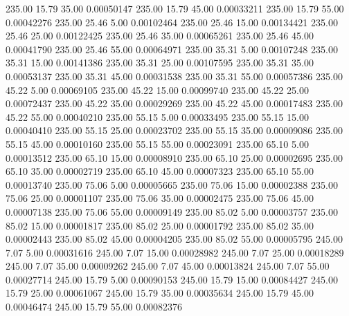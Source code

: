     235.00     15.79     35.00     0.00050147
    235.00     15.79     45.00     0.00033211
    235.00     15.79     55.00     0.00042276
    235.00     25.46      5.00     0.00102464
    235.00     25.46     15.00     0.00134421
    235.00     25.46     25.00     0.00122425
    235.00     25.46     35.00     0.00065261
    235.00     25.46     45.00     0.00041790
    235.00     25.46     55.00     0.00064971
    235.00     35.31      5.00     0.00107248
    235.00     35.31     15.00     0.00141386
    235.00     35.31     25.00     0.00107595
    235.00     35.31     35.00     0.00053137
    235.00     35.31     45.00     0.00031538
    235.00     35.31     55.00     0.00057386
    235.00     45.22      5.00     0.00069105
    235.00     45.22     15.00     0.00099740
    235.00     45.22     25.00     0.00072437
    235.00     45.22     35.00     0.00029269
    235.00     45.22     45.00     0.00017483
    235.00     45.22     55.00     0.00040210
    235.00     55.15      5.00     0.00033495
    235.00     55.15     15.00     0.00040410
    235.00     55.15     25.00     0.00023702
    235.00     55.15     35.00     0.00009086
    235.00     55.15     45.00     0.00010160
    235.00     55.15     55.00     0.00023091
    235.00     65.10      5.00     0.00013512
    235.00     65.10     15.00     0.00008910
    235.00     65.10     25.00     0.00002695
    235.00     65.10     35.00     0.00002719
    235.00     65.10     45.00     0.00007323
    235.00     65.10     55.00     0.00013740
    235.00     75.06      5.00     0.00005665
    235.00     75.06     15.00     0.00002388
    235.00     75.06     25.00     0.00001107
    235.00     75.06     35.00     0.00002475
    235.00     75.06     45.00     0.00007138
    235.00     75.06     55.00     0.00009149
    235.00     85.02      5.00     0.00003757
    235.00     85.02     15.00     0.00001817
    235.00     85.02     25.00     0.00001792
    235.00     85.02     35.00     0.00002443
    235.00     85.02     45.00     0.00004205
    235.00     85.02     55.00     0.00005795
    245.00      7.07      5.00     0.00031616
    245.00      7.07     15.00     0.00028982
    245.00      7.07     25.00     0.00018289
    245.00      7.07     35.00     0.00009262
    245.00      7.07     45.00     0.00013824
    245.00      7.07     55.00     0.00027714
    245.00     15.79      5.00     0.00090153
    245.00     15.79     15.00     0.00084427
    245.00     15.79     25.00     0.00061067
    245.00     15.79     35.00     0.00035634
    245.00     15.79     45.00     0.00046474
    245.00     15.79     55.00     0.00082376
